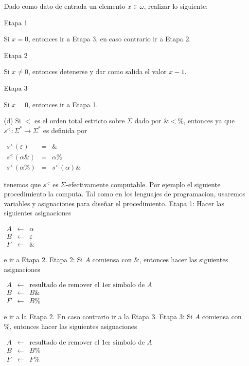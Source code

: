 Dado como dato de entrada un elemento \(x\in \omega \), realizar lo siguiente:

Etapa 1

Si \(x=0\), entonces ir a Etapa 3, en caso contrario ir a Etapa 2.

Etapa 2

Si \(x\neq 0\), entonces detenerse y dar como salida el valor \(x-1\).

Etapa 3

Si \(x=0\), entonces ir a Etapa 1.

(d) Si \(< \) es el orden total estricto sobre \(\Sigma \) dado por \(\& < \%\), entonces ya que \(s^{< }:\Sigma ^{\ast }\rightarrow \Sigma ^{\ast }\) es definida por

\(\displaystyle \begin{array}{rcl} s^{< }(\varepsilon ) & =& \& \\ s^{< }(\alpha \& ) & =& \alpha \% \\ s^{< }(\alpha \%) & =& s^{< }(\alpha )\& \end{array} \)

tenemos que \(s^{< }\) es \(\Sigma \)-efectivamente computable. Por ejemplo el siguiente procedimiento la computa. Tal como en los lenguajes de programacion, usaremos variables y asignaciones para dise\~{n}ar el procedimiento.
Etapa 1: Hacer las siguientes asignaciones

\(\displaystyle \begin{array}{rcl} A & \leftarrow & \alpha \\ B & \leftarrow & \varepsilon \\ F & \leftarrow & \& \end{array} \)

e ir a Etapa 2.
Etapa 2: Si \(A\) comiensa con \(\& \), entonces hacer las siguientes asignaciones

\(\displaystyle \begin{array}{rcl} A & \leftarrow & \text{resultado de remover el 1er simbolo de }A \\ B & \leftarrow & B\& \\ F & \leftarrow & B\% \end{array} \)

e ir a la Etapa 2. En caso contrario ir a la Etapa 3.
Etapa 3: Si \(A\) comiensa con \(\%\), entonces hacer las siguientes asignaciones

\(\displaystyle \begin{array}{rcl} A & \leftarrow & \text{resultado de remover el 1er simbolo de }A \\ B & \leftarrow & B\% \\ F & \leftarrow & F\% \end{array} \)

